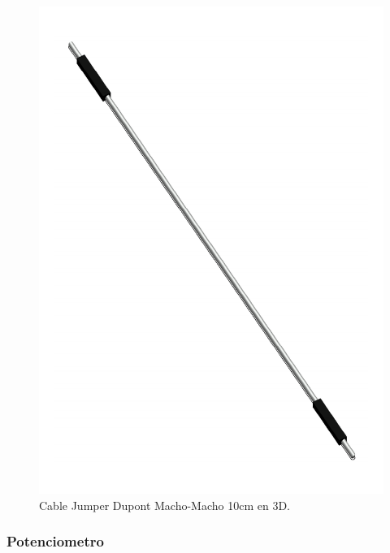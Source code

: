     \begin{figure}[H]
        \centering
        \includegraphics[scale=0.4]{15/img/cableJumperMMModelo.pdf}
        \caption{Cable Jumper Dupont Macho-Macho 10cm en 3D.}
        \label{fig:cableJumperMMModelo}
    \end{figure}
    
    \subsubsection{Potenciometro}
    
    
    
